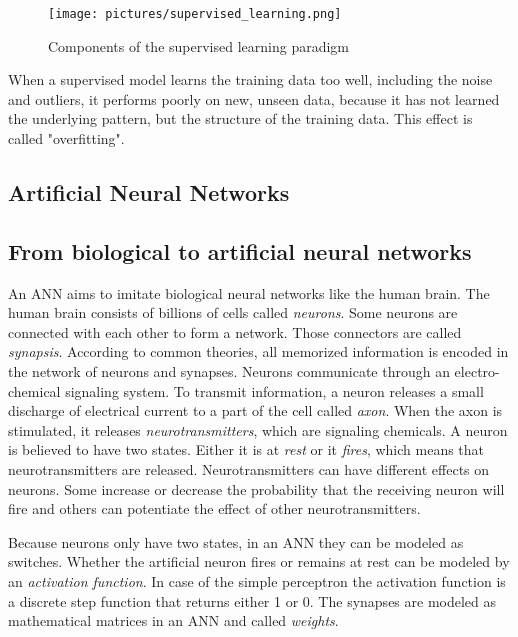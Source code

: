 \begin{figure}[ht]
    \centering 
    \texttt{[image: pictures/supervised\_learning.png]}
    \caption{Components of the supervised learning paradigm \cite{knudsen1994supervised}}
    \label{pic:supervised}    %
\end{figure}

When a supervised model learns the training data too well, including the noise and outliers, it performs poorly on new, unseen data, because it has not learned the underlying pattern, but the structure of the training data. This effect is called "overfitting".
\cite{haykin2009neural,knudsen1994supervised}

\subsection{Artificial Neural Networks}
\subsection*{From biological to artificial neural networks}
An \acf{ANN} aims to imitate biological neural networks like the human brain. The human brain consists of billions of cells called \textit{neurons}. Some neurons are connected with each other to form a network. Those connectors are called \textit{synapsis}. According to common theories, all memorized information is encoded in the network of neurons and synapses. Neurons communicate through an electro-chemical signaling system. To transmit information, a neuron releases a small discharge of electrical current to a part of the cell called \textit{axon}. When the axon is stimulated, it releases \textit{neurotransmitters}, which are signaling chemicals. 
A neuron is believed to have two states. Either it is at \textit{rest} or it \textit{fires}, which means that neurotransmitters are released. 
Neurotransmitters can have different effects on neurons. Some increase or decrease the probability that the receiving neuron will fire and others can potentiate the effect of other neurotransmitters.

Because neurons only have two states, in an \ac{ANN} they can be modeled as switches. Whether the artificial neuron fires or remains at rest can be modeled by an \textit{activation function}. In case of the simple perceptron the activation function is a discrete step function that returns either 1 or 0. The synapses are modeled as mathematical matrices in an \ac{ANN} and called \textit{weights}.
\cite{haykin2009neural,knudsen1994supervised}


